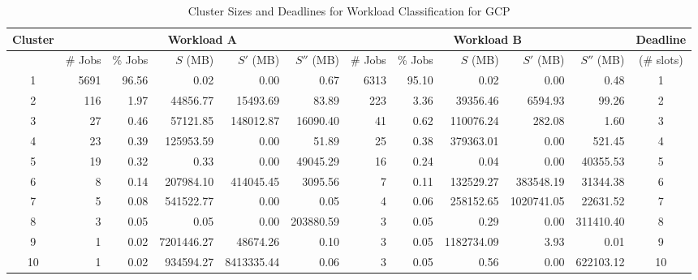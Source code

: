 \documentclass[10pt,conference,compsocconf,letterpaper]{IEEEtran}
\begin{document}
\begin{table*}[!t]
  \centering
  \caption{Cluster Sizes and Deadlines for Workload Classification for GCP}
   \begin{tabular}{c|r|r|r|r|r|r|r|r|r|r|c}
    \hline \hline
    Cluster & \multicolumn{5}{c|}{Workload A}        & \multicolumn{5}{c|}{Workload B}        & Deadline \\
    \hline
          & \# Jobs & \% Jobs & $S$ (MB) & $S'$ (MB) & $S''$ (MB) & \# Jobs & \% Jobs & $S$ (MB) & $S'$ (MB) & $S''$ (MB) & (\# slots) \\ \hline
    1     & 5691  & 96.56 & 0.02  & 0.00  & 0.67  & 6313  & 95.10 & 0.02  & 0.00  & 0.48  & 1 \\
    2     & 116   & 1.97  & 44856.77 & 15493.69 & 83.89 & 223   & 3.36  & 39356.46 & 6594.93 & 99.26 & 2 \\
    3     & 27    & 0.46  & 57121.85 & 148012.87 & 16090.40 & 41    & 0.62  & 110076.24 & 282.08 & 1.60  & 3 \\
    4     & 23    & 0.39  & 125953.59 & 0.00  & 51.89 & 25    & 0.38  & 379363.01 & 0.00  & 521.45 & 4 \\
    5     & 19    & 0.32  & 0.33  & 0.00  & 49045.29 & 16    & 0.24  & 0.04  & 0.00  & 40355.53 & 5 \\
    6     & 8     & 0.14  & 207984.10 & 414045.45 & 3095.56 & 7     & 0.11  & 132529.27 & 383548.19 & 31344.38 & 6 \\
    7     & 5     & 0.08  & 541522.77 & 0.00  & 0.05  & 4     & 0.06  & 258152.65 & 1020741.05 & 22631.52 & 7 \\
    8     & 3     & 0.05  & 0.05  & 0.00  & 203880.59 & 3     & 0.05  & 0.29  & 0.00  & 311410.40 & 8 \\
    9     & 1     & 0.02  & 7201446.27 & 48674.26 & 0.10  & 3     & 0.05  & 1182734.09 & 3.93  & 0.01  & 9 \\
    10    & 1     & 0.02  & 934594.27 & 8413335.44 & 0.06  & 3     & 0.05  & 0.56  & 0.00  & 622103.12 & 10 \\
    \hline
    \end{tabular}\label{table:gcp}\end{table*}
\end{document}
